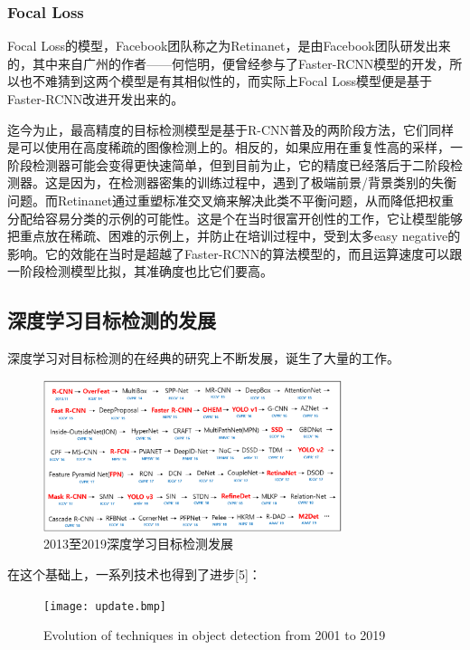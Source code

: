\documentclass[journal,transmag]{IEEEtran}
\begin{document}
\subsubsection{Focal Loss}
Focal Loss的模型，Facebook团队称之为Retinanet，是由Facebook团队研发出来的，其中来自广州的作者——何恺明，便曾经参与了Faster-RCNN模型的开发，所以也不难猜到这两个模型是有其相似性的，而实际上Focal Loss模型便是基于Faster-RCNN改进开发出来的。

迄今为止，最高精度的目标检测模型是基于R-CNN普及的两阶段方法，它们同样是可以使用在高度稀疏的图像检测上的。相反的，如果应用在重复性高的采样，一阶段检测器可能会变得更快速简单，但到目前为止，它的精度已经落后于二阶段检测器。这是因为，在检测器密集的训练过程中，遇到了极端前景/背景类别的失衡问题。而Retinanet通过重塑标准交叉熵来解决此类不平衡问题，从而降低把权重分配给容易分类的示例的可能性。这是个在当时很富开创性的工作，它让模型能够把重点放在稀疏、困难的示例上，并防止在培训过程中，受到太多easy negative的影响。它的效能在当时是超越了Faster-RCNN的算法模型的，而且运算速度可以跟一阶段检测模型比拟，其准确度也比它们要高。


\subsection{深度学习目标检测的发展}
深度学习对目标检测的在经典的研究上不断发展，诞生了大量的工作。
\begin{figure}[h]
\centering
\includegraphics[width=3.44in]{list.bmp}
\caption{2013至2019深度学习目标检测发展}
\end{figure}

在这个基础上，一系列技术也得到了进步[5]：
\begin{figure}[h]
\centering
\texttt{[image: update.bmp]}
\caption{Evolution of techniques in object detection from 2001 to 2019}
\end{figure}
\end{document}
